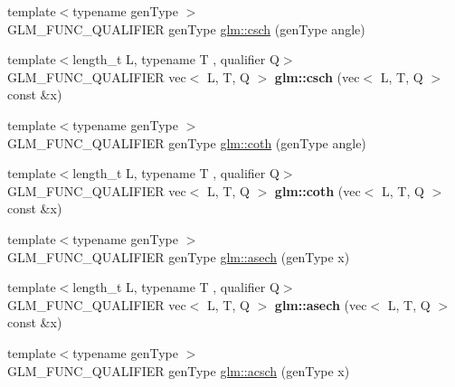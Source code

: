 \begin{DoxyCompactItemize}
{\footnotesize template$<$typename gen\+Type $>$ }\\G\+L\+M\+\_\+\+F\+U\+N\+C\+\_\+\+Q\+U\+A\+L\+I\+F\+I\+ER gen\+Type \hyperlink{group__gtc__reciprocal_ga6d95843ff3ca6472ab399ba171d290a0}{glm\+::csch} (gen\+Type angle)
\item 
\mbox{\label{reciprocal_8inl_ae9a5f04302025ecbac45e78abf52de3d}} 
{\footnotesize template$<$length\+\_\+t L, typename T , qualifier Q$>$ }\\G\+L\+M\+\_\+\+F\+U\+N\+C\+\_\+\+Q\+U\+A\+L\+I\+F\+I\+ER vec$<$ L, T, Q $>$ {\bfseries glm\+::csch} (vec$<$ L, T, Q $>$ const \&x)
\item 
{\footnotesize template$<$typename gen\+Type $>$ }\\G\+L\+M\+\_\+\+F\+U\+N\+C\+\_\+\+Q\+U\+A\+L\+I\+F\+I\+ER gen\+Type \hyperlink{group__gtc__reciprocal_ga6b8b770eb7198e4dea59d52e6db81442}{glm\+::coth} (gen\+Type angle)
\item 
\mbox{\label{reciprocal_8inl_a4790eeb4b646c3aec2de157132cb89dd}} 
{\footnotesize template$<$length\+\_\+t L, typename T , qualifier Q$>$ }\\G\+L\+M\+\_\+\+F\+U\+N\+C\+\_\+\+Q\+U\+A\+L\+I\+F\+I\+ER vec$<$ L, T, Q $>$ {\bfseries glm\+::coth} (vec$<$ L, T, Q $>$ const \&x)
\item 
{\footnotesize template$<$typename gen\+Type $>$ }\\G\+L\+M\+\_\+\+F\+U\+N\+C\+\_\+\+Q\+U\+A\+L\+I\+F\+I\+ER gen\+Type \hyperlink{group__gtc__reciprocal_gaec7586dccfe431f850d006f3824b8ca6}{glm\+::asech} (gen\+Type x)
\item 
\mbox{\label{reciprocal_8inl_aeb94099dd5c0ed8df43ee69b8416af32}} 
{\footnotesize template$<$length\+\_\+t L, typename T , qualifier Q$>$ }\\G\+L\+M\+\_\+\+F\+U\+N\+C\+\_\+\+Q\+U\+A\+L\+I\+F\+I\+ER vec$<$ L, T, Q $>$ {\bfseries glm\+::asech} (vec$<$ L, T, Q $>$ const \&x)
\item 
{\footnotesize template$<$typename gen\+Type $>$ }\\G\+L\+M\+\_\+\+F\+U\+N\+C\+\_\+\+Q\+U\+A\+L\+I\+F\+I\+ER gen\+Type \hyperlink{group__gtc__reciprocal_ga4b50aa5e5afc7e19ec113ab91596c576}{glm\+::acsch} (gen\+Type x)
\item 
\mbox{\label{reciprocal_8inl_ad3e98048cc8e5693ace0b9b82e8e961e}} 

\end{DoxyCompactItemize}
